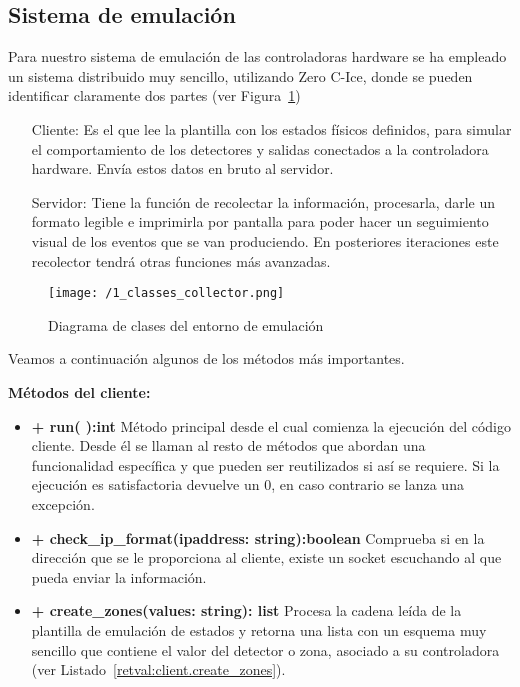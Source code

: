 \subsection{Sistema de emulación}

Para nuestro sistema de emulación de las controladoras hardware se ha empleado un sistema distribuido muy sencillo, utilizando Zero C-Ice, donde se pueden identificar claramente dos partes (ver Figura~\ref{fig:1_classes_collector})

\begin{itemize}
  \item[Cliente:] Es el que lee la plantilla con los estados físicos definidos, para simular el comportamiento de los detectores y salidas conectados a la controladora hardware. Envía estos datos en bruto al servidor.
  \item[Servidor:] Tiene la función de recolectar la información, procesarla, darle un formato legible e imprimirla por pantalla para poder hacer un seguimiento visual de los eventos que se van produciendo. En posteriores iteraciones este recolector tendrá otras funciones más avanzadas.
\end{itemize}

\begin{figure}[h]
\centering
\texttt{[image: /1\_classes\_collector.png]}
\caption{Diagrama de clases del entorno de emulación}
\label{fig:1_classes_collector}
\end{figure}

Veamos a continuación algunos de los métodos más importantes.

\textbf{Métodos del cliente:}

\begin{itemize}
  \item \textbf{+ run( ):int} Método principal desde el cual comienza la ejecución del código cliente. Desde él se llaman al resto de métodos que abordan una funcionalidad específica y que pueden ser reutilizados si así se requiere. Si la ejecución es satisfactoria devuelve un 0, en caso contrario se lanza una excepción.
  \item \textbf{+ check\_ip\_format(ipaddress: string):boolean} Comprueba si en la dirección que se le proporciona al cliente, existe un socket escuchando al que pueda enviar la información. 
  \item \textbf{+ create\_zones(values: string): list} Procesa la cadena leída de la plantilla de emulación de estados y retorna una lista con un esquema muy sencillo que contiene el valor del detector o zona, asociado a su controladora (ver Listado~\ref{retval:client.create_zones}).
\end{itemize}

